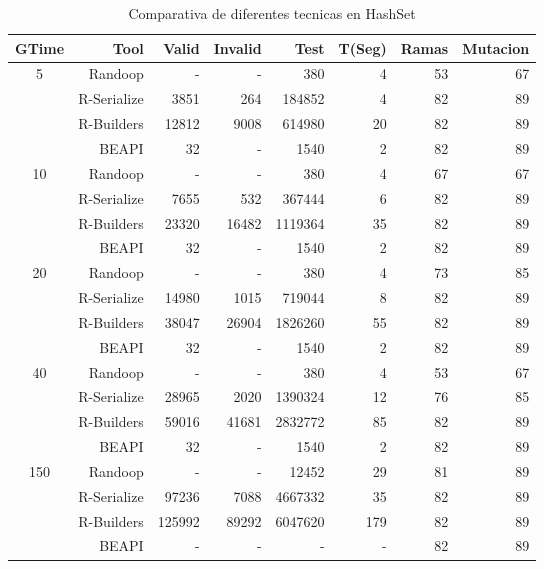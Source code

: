 \begin{table}[H]
\scriptsize
\centering
\label{tab:results-obj1}
\begin{tabular}{ c  r  |r | r | r|r|r|r  }
  \toprule
  \textbf{GTime} & \textbf{Tool} & \textbf{Valid}  & \textbf{Invalid} & \textbf{Test}&\textbf{T(Seg)} &\textbf{Ramas}  & \textbf{Mutacion} \\ 
  \midrule
5	&	Randoop	&	-	&	- & 380 & 4	& 53 & 67 \\
& R-Serialize	& 3851 & 264 & 184852 & 4	& 82 &	89 	\\
& R-Builders		& 12812 & 9008 & 614980 & 20 &	82	& 89  \\
&	BEAPI & 32 & - & 1540 & 2	& 82 & 89 \\
\cline{2-8}
10	&	Randoop	&	-	&	- & 380 & 4	& 67 & 67 \\
& R-Serialize	& 7655 & 532 & 367444 & 6	& 82 &	89 	\\
& R-Builders		& 23320 & 16482 & 1119364 & 35 &	82	& 89  \\
&	BEAPI & 32 & - & 1540 & 2	& 82 & 89 \\
\cline{2-8}
20	&	Randoop	&	-	&	- & 380 & 4	& 73 & 85 \\
& R-Serialize	& 14980 & 1015 & 719044 & 8	& 82 &	89 	\\
& R-Builders		& 38047 & 26904 & 1826260 & 55 &	82	& 89  \\
&	BEAPI & 32 & - & 1540 & 2	& 82 & 89 \\

\cline{2-8}
40	&	Randoop	&	-	&	- & 380 & 4	& 53 & 67 \\
& R-Serialize	& 28965 & 2020 & 1390324 & 12		& 76 &	85 	\\
& R-Builders		& 59016 & 41681 & 2832772 & 85 	& 82 &	89 	  \\
&	BEAPI & 32 & - & 1540 & 2	& 82 &	89 \\
\cline{2-8}
150	&	Randoop	&	-	&	- & 12452 & 29	& 81 & 89\\
& R-Serialize	& 97236 & 7088 & 4667332 & 35	& 82 &	89 	\\
& R-Builders		& 125992 & 89292 & 6047620 & 179 & 82 &	89  \\
&	BEAPI & - & - & - & -	& 82 &	89 \\
\midrule
\end{tabular}
\caption{Comparativa de diferentes tecnicas en HashSet}
\end{table}


